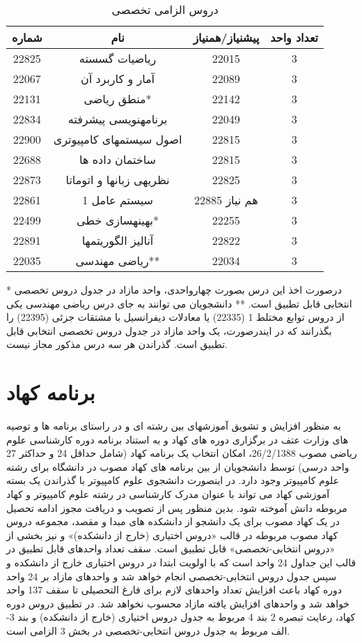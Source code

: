\documentclass{article}
\begin{document}
\begin{table}[H]
\begin{center}
\begin{tabular}{|c|c|c|c|}
	\hline
	شماره & نام & پیشنیاز/همنیاز & تعداد واحد \\
	\hline
	22825 & ریاضیات گسسته &  22015 & 3 \\
	\hline
	22067 & آمار و کاربرد آن & 22089 & 3 \\
	\hline
	22131 & منطق ریاضی* & 22142 & 3 \\
	\hline
	22834 & برنامهنویسی پیشرفته & 22049 & 3 \\
	\hline
	22900 & اصول سیستمهای کامپیوتری & 22815 & 3 \\
	\hline
	22688 & ساختمان داده ها & 22815 & 3 \\
	\hline
	22873 & نظریهی زبانها و اتوماتا & 22825 & 3 \\
	\hline
	22861 & سیستم عامل 1 & 22885 هم نیاز & 3 \\
	\hline
	22499 & بهینهسازی خطی* & 22255 & 3 \\
	\hline
	22891 & آنالیز الگوریتمها & 22822 & 3 \\
	\hline
	22035 & ریاضی مهندسی** & 22034 & 3 \\
	\hline
\end{tabular}
\caption{\label{cs-t4}
دروس الزامی تخصصی
}
\end{center}
\end{table}
* درصورت اخذ این درس بصورت چهارواحدی، واحد مازاد در جدول دروس تخصصی انتخابی قابل تطبیق است.
** دانشجویان می توانند به جای درس ریاضی مهندسی یکی از دروس توابع مختلط 1 (22335) یا معادلات دیفرانسیل با مشتقات جزئی (22395) را بگذرانند که در ایندرصورت، یک واحد مازاد در جدول دروس تخصصی انتخابی قابل تطبیق است. گذراندن هر سه درس مذکور مجاز نیست. 

\section{برنامه کهاد}
به منظور افزایش و تشویق آموزشهای بین رشته ای و در راستای برنامه ها و توصیه های وزارت عتف در برگزاری دوره های کهاد و به استناد برنامه دوره کارشناسی علوم ریاضی مصوب 26/2/1388، امکان انتخاب یک برنامه کهاد (شامل حداقل 24 و حداکثر 27 واحد درسی) توسط دانشجویان از بین برنامه های کهاد مصوب در دانشگاه برای رشته علوم کامپیوتر وجود دارد. در اینصورت دانشجوی علوم کامپیوتر با گذراندن یک بسته آموزشی کهاد می تواند با عنوان مدرک کارشناسی در رشته علوم کامپیوتر و کهاد مربوطه دانش آموخته شود. بدین منظور پس از تصویب و دریافت مجوز ادامه تحصیل در یک کهاد مصوب برای یک دانشجو از دانشکده های مبدا و مقصد، مجموعه دروس کهاد مصوب مربوطه در قالب «دروس اختیاری (خارج از دانشکده)» و نیز بخشی از «دروس انتخابی-تخصصی» قابل تطبیق است. سقف تعداد واحدهای قابل تطبیق در قالب این جداول 24 واحد است که با اولویت ابتدا در دروس اختیاری خارج از دانشکده و سپس جدول دروس انتخابی-تخصصی انجام خواهد شد و واحدهای مازاد بر 24 واحد دوره کهاد باعث افزایش تعداد واحدهای لازم برای فارغ التحصیلی تا سقف 137 واحد خواهد شد و واحدهای افزایش یافته مازاد محسوب نخواهد شد. در تطبیق دروس دوره کهاد، رعایت تبصره 2 بند 4 مربوط به جدول دروس اختیاری (خارج از دانشکده) و بند 3-الف مربوط به جدول دروس انتخابی-تخصصی در بخش 3 الزامی است. 
\end{document}
